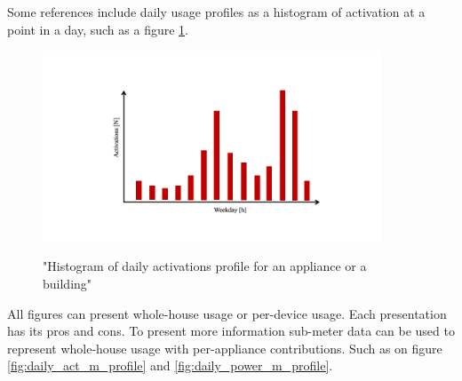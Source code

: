 Some references include daily usage profiles as a histogram of activation at a point in a day, such as a figure \ref{fig:daily_act_profile}.

\begin{figure}[H]
	\centering
	\caption{"Histogram of daily activations profile for an appliance or a building"}
	\includegraphics[width=0.9\textwidth]{Figures/profile_sketches/Slide5.png}
	\label{fig:daily_act_profile}
\end{figure}

All figures can present whole-house usage or per-device usage. Each presentation has its pros and cons. 
To present more information sub-meter data can be used to represent whole-house usage with per-appliance contributions.
Such as on figure \ref{fig:daily_act_m_profile} and \ref{fig:daily_power_m_profile}.

